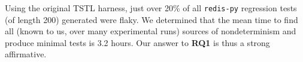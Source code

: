 {Using the original TSTL harness, just over 20\% of all {\tt redis-py}
regression tests (of length 200) generated were flaky.  We determined
that the mean time to find all (known to us, over many experimental runs)
sources of nondeterminism and produce minimal tests is 3.2 
hours.  Our answer to {\bf RQ1} is thus a strong affirmative. 

}
